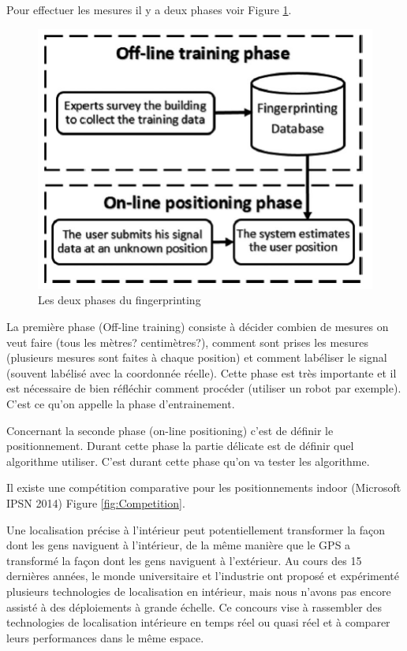 Pour effectuer les mesures il y a deux phases voir Figure \ref{fig:Fingerprinting}. 

\begin{figure}[htp]
	\begin{center}
		\includegraphics[scale=1]{figures/Fingerprinting.png}
		\caption{Les deux phases du fingerprinting}
		\label{fig:Fingerprinting} %
	\end{center}
\end{figure}

La première phase (Off-line training) consiste à décider combien de mesures on veut faire (tous les mètres? centimètres?), comment sont prises les mesures (plusieurs mesures sont faites à chaque position) et comment labéliser le signal (souvent labélisé avec la coordonnée réelle). Cette phase est très importante et il est nécessaire de bien réfléchir comment procéder (utiliser un robot par exemple). C'est ce qu'on appelle la phase d'entrainement.

Concernant la seconde phase (on-line positioning) c'est de définir le positionnement. Durant cette phase la partie délicate est de définir quel algorithme utiliser. C'est durant cette phase qu'on va tester les algorithme. 

Il existe une compétition comparative pour les positionnements indoor (Microsoft IPSN 2014) Figure \ref{fig:Competition}.

Une localisation précise à l'intérieur peut potentiellement transformer la façon dont les gens naviguent à l'intérieur, de la même manière que le GPS a transformé la façon dont les gens naviguent à l'extérieur. Au cours des 15 dernières années, le monde universitaire et l’industrie ont proposé et expérimenté plusieurs technologies de localisation en intérieur, mais nous n’avons pas encore assisté à des déploiements à grande échelle. Ce concours vise à rassembler des technologies de localisation intérieure en temps réel ou quasi réel et à comparer leurs performances dans le même espace. \cite{MICRO}

